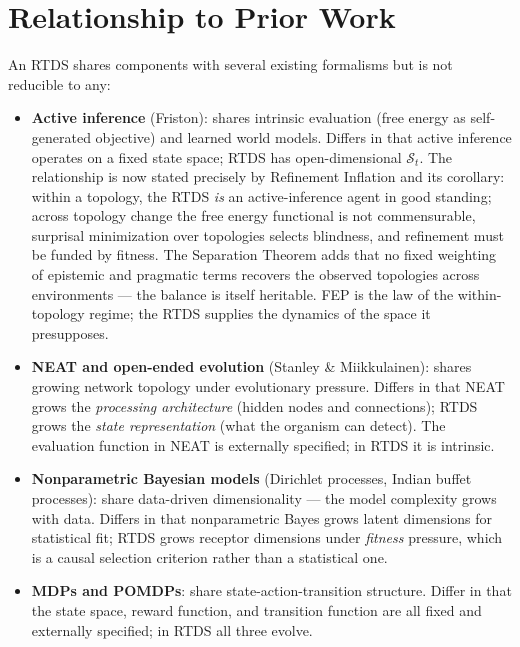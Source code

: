 \documentclass[12pt]{article}
\theoremstyle{definition}
\begin{document}
\section{Relationship to Prior Work}

An RTDS shares components with several existing formalisms but is not reducible to any:

\begin{itemize}
    \item \textbf{Active inference} (Friston): shares intrinsic evaluation (free energy
    as self-generated objective) and learned world models. Differs in that active inference
    operates on a fixed state space; RTDS has open-dimensional $\mathcal{S}_t$. The
    relationship is now stated precisely by Refinement Inflation and its corollary:
    within a topology, the RTDS \emph{is} an active-inference agent in good standing;
    across topology change the free energy functional is not commensurable, surprisal
    minimization over topologies selects blindness, and refinement must be funded by
    fitness. The Separation Theorem adds that no fixed weighting of epistemic and
    pragmatic terms recovers the observed topologies across environments --- the balance
    is itself heritable. FEP is the law of the within-topology regime; the RTDS supplies
    the dynamics of the space it presupposes.

    \item \textbf{NEAT and open-ended evolution} (Stanley \& Miikkulainen): shares
    growing network topology under evolutionary pressure. Differs in that NEAT grows
    the \emph{processing architecture} (hidden nodes and connections); RTDS grows the
    \emph{state representation} (what the organism can detect). The evaluation function
    in NEAT is externally specified; in RTDS it is intrinsic.

    \item \textbf{Nonparametric Bayesian models} (Dirichlet processes, Indian buffet
    processes): share data-driven dimensionality --- the model complexity grows with
    data. Differs in that nonparametric Bayes grows latent dimensions for statistical
    fit; RTDS grows receptor dimensions under \emph{fitness} pressure, which is a
    causal selection criterion rather than a statistical one.

    \item \textbf{MDPs and POMDPs}: share state-action-transition structure. Differ in
    that the state space, reward function, and transition function are all fixed and
    externally specified; in RTDS all three evolve.
\end{itemize}
\end{document}
